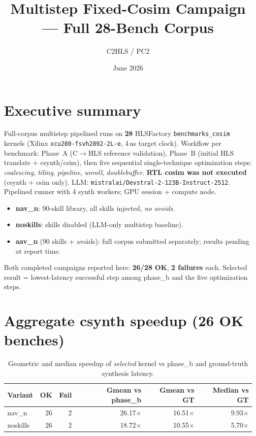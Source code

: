 \documentclass[11pt]{article}
\title{Multistep Fixed-Cosim Campaign --- Full 28-Bench Corpus}
\author{C2HLS / PC2}
\date{June 2026}
\begin{document}
\maketitle

\section*{Executive summary}

Full-corpus multistep pipelined runs on \textbf{28} HLSFactory \texttt{benchmarks\_cosim} kernels
(Xilinx \texttt{xcu280-fsvh2892-2L-e}, 4\,ns target clock). Workflow per benchmark:
Phase~A (C$\rightarrow$HLS reference validation), Phase~B (initial HLS translate + csynth/csim),
then five sequential single-technique optimization steps:
\emph{coalescing}, \emph{tiling}, \emph{pipeline}, \emph{unroll}, \emph{doublebuffer}.
\textbf{RTL cosim was not executed} (csynth + csim only).
LLM: \texttt{mistralai/Devstral-2-123B-Instruct-2512}.
Pipelined runner with 4 synth workers; GPU session + compute node.

\begin{itemize}
  \item \textbf{nav\_n}: 90-skill library, all skills injected, \emph{no avoids}.
  \item \textbf{noskills}: skills disabled (LLM-only multistep baseline).
  \item \textbf{aav\_n} (90 skills + avoids): full corpus submitted separately; results pending at report time.
\end{itemize}

Both completed campaigns reported here: \textbf{26/28 OK}, \textbf{2 failures} each.
Selected result = lowest-latency successful step among phase\_b and the five optimization steps.

\section{Aggregate csynth speedup (26 OK benches)}

\begin{table}[h]
\centering
\caption{Geometric and median speedup of \emph{selected} kernel vs phase\_b and ground-truth synthesis latency.}
\begin{tabular}{@{}lrrrrr@{}}
\toprule
\textbf{Variant} & \textbf{OK} & \textbf{Fail} & \textbf{Gmean vs phase\_b} & \textbf{Gmean vs GT} & \textbf{Median vs GT} \\
\midrule
nav\_n & 26 & 2 & 26.17$\times$ & 16.51$\times$ & 9.93$\times$ \\
noskills & 26 & 2 & 18.72$\times$ & 10.55$\times$ & 5.70$\times$ \\
\bottomrule
\end{tabular}
\end{table}
\end{document}
